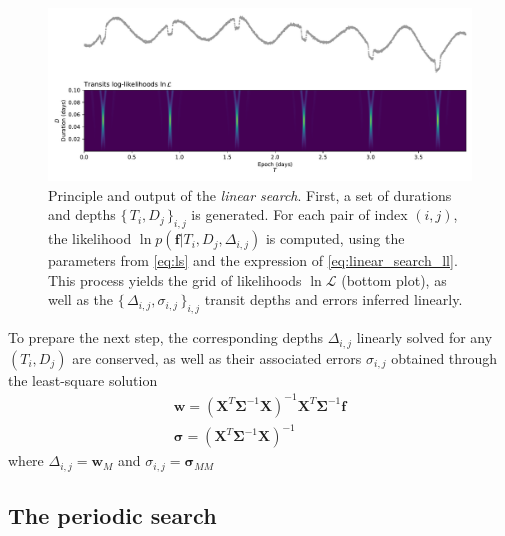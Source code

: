 \documentclass{aastex631}
\newcommand{\set}[1]{\{\,#1\,\}}
\begin{document}
\begin{figure}[H]
    \begin{centering}
        \includegraphics[width=0.95\linewidth]{../figures/principle_linear_search.pdf}
        \caption{Principle and output of the \textit{linear search}. First, a set of durations and depths $\set{T_i, D_j}_{i,j}$ is generated. For each pair of index $(i,j)$, the likelihood $\ln p(\bm{f} \vert T_i ,D_j, \Delta_{i,j})$ is computed, using the parameters from \autoref{eq:ls} and the expression of \autoref{eq:linear_search_ll}. This process yields the grid of likelihoods $\ln\mathcal{L}$ (bottom plot), as well as the $\set{\Delta_{i,j}, \sigma_{i,j}}_{i, j}$ transit depths and errors inferred linearly.}
        \label{fig:linear_search}
    \end{centering}
\end{figure}

To prepare the next step, the corresponding depths $\Delta_{i,j}$ linearly solved for any $(T_i ,D_j)$ are conserved, as well as their associated errors $\sigma_{i,j}$ obtained through the least-square solution
\begin{equation}\label{eq:ls}
    \begin{gathered}
        \bm{w} = (\bm{X}^T\bm{\Sigma}^{-1}\bm{X})^{-1}\bm{X}^T\bm{\Sigma}^{-1}\bm{f} \\
        \bm{\sigma} = (\bm{X}^T\bm{\Sigma}^{-1}\bm{X})^{-1}
    \end{gathered}
\end{equation}    
where $\Delta_{i,j} = \bm{w}_M$ and $\sigma_{i,j} = \bm{\sigma}_{MM}$

\subsection{The periodic search}
\end{document}
